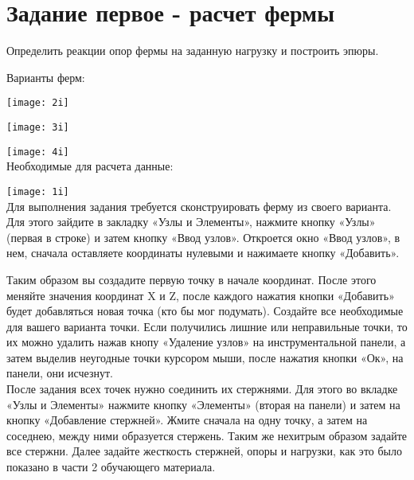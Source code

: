 \documentclass[a4paper,12pt]{article}
\begin{document}
\part*{Задание первое - расчет фермы}
Определить реакции опор фермы на заданную нагрузку и построить эпюры. 

Варианты ферм:

\texttt{[image: 2i]}

\texttt{[image: 3i]}

\texttt{[image: 4i]}
\\
Необходимые для расчета данные: 

\texttt{[image: 1i]}
\\
Для выполнения задания требуется сконструировать ферму из своего варианта. \\

Для этого зайдите в закладку «Узлы и Элементы», нажмите кнопку «Узлы» 
(первая в строке) и затем кнопку «Ввод узлов». Откроется окно «Ввод узлов», 
в нем, сначала оставляете координаты нулевыми и нажимаете кнопку «Добавить». 
\begin{figure}[h]
 \center{\texttt{[image: a1]}}
 \label{ris:a1}
\end{figure}
Таким образом вы создадите первую точку в начале координат. После этого меняйте 
значения координат X и Z, после каждого нажатия кнопки «Добавить» будет 
добавляться новая точка (кто бы мог подумать).  Создайте все необходимые для 
вашего варианта точки. Если получились лишние или неправильные точки, то их 
можно удалить нажав кнопу «Удаление узлов» на инструментальной панели, а затем 
выделив неугодные точки курсором мыши, после нажатия кнопки «Ок», на панели, они исчезнут. \\

После задания всех точек нужно соединить их стержнями. Для этого во вкладке 
«Узлы и Элементы» нажмите кнопку «Элементы» (вторая на панели) и затем на 
кнопку «Добавление стержней».  Жмите сначала на одну точку, а затем на 
соседнею, между ними образуется стержень. Таким же нехитрым образом задайте все стержни.
Далее задайте жесткость стержней, опоры и нагрузки, как это было показано в 
части 2 обучающего материала. \\
\end{document}
